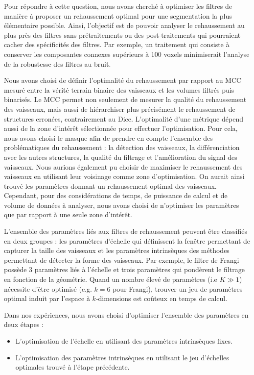 Pour répondre à cette question, nous avons cherché à optimiser les filtres de manière à proposer un rehaussement optimal pour une segmentation la plus élémentaire possible. Ainsi, l'objectif est de pouvoir analyser le rehaussement au plus près des filtres sans prétraitements ou des post-traitements qui pourraient cacher des spécificités des filtres. Par exemple, un traitement qui consiste à conserver les composantes connexes supérieurs à 100 voxels minimiserait l'analyse de la robustesse des filtres au bruit.

Nous avons choisi de définir l'optimalité du rehaussement par rapport au MCC mesuré entre la vérité terrain binaire des vaisseaux et les volumes filtrés puis binarisés. Le MCC permet non seulement de mesurer la qualité du rehaussement des vaisseaux, mais aussi de hiérarchiser plus précisément le rehaussement de structures erronées, contrairement au Dice. L'optimalité d'une métrique dépend aussi de la zone d'intérêt sélectionnée pour effectuer l'optimisation. Pour cela, nous avons choisi le masque \maskglobal afin de prendre en compte l'ensemble des problématiques du rehaussement : la détection des vaisseaux, la  différenciation avec les autres structures, la qualité du filtrage et l'amélioration du signal des vaisseaux. Nous aurions également pu choisir de maximiser le rehaussement des vaisseaux en utilisant leur voisinage comme zone d'optimisation. On aurait ainsi trouvé les paramètres donnant un rehaussement optimal des vaisseaux. Cependant, pour des considérations de temps, de puissance de calcul et de volume de données à analyser, nous avons choisi de n'optimiser les paramètres que par rapport à une seule zone d'intérêt.

L'ensemble des paramètres liés aux filtres de rehaussement peuvent être classifiés en deux groupes : les paramètres d'échelle qui définissent la fenêtre permettant de capturer la taille des vaisseaux et les paramètres intrinsèques des méthodes permettant de détecter la forme des vaisseaux. Par exemple, le filtre de Frangi possède 3 paramètres liés à l'échelle et trois paramètres qui pondèrent le filtrage en fonction de la géométrie. Quand un nombre élevé de paramètres (i.e $K \gg 1$) nécessite d'être optimisé (e.g. $k=6$ pour Frangi), trouver un jeu de paramètres optimal induit par l'espace à $k$-dimensions est coûteux en temps de calcul.

Dans nos expériences, nous avons choisi d'optimiser l'ensemble des paramètres en deux étapes :

\begin{itemize}
\item L'optimisation de l'échelle en utilisant des paramètres intrinsèques fixes.
\item L'optimisation des paramètres intrinsèques en utilisant le jeu d'échelles optimales trouvé à l'étape précédente.
\end{itemize}

